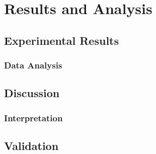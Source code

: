 \chapter{Results and Analysis}
\label{ch:results}

\lipsum[29-30]

\section{Experimental Results}
\label{sec:experimental-results}

\lipsum[31-32]

\subsection{Data Analysis}
\label{subsec:data-analysis}

\lipsum[33]

\section{Discussion}
\label{sec:discussion}

\lipsum[34-35]

\subsection{Interpretation}
\label{subsec:interpretation}

\lipsum[36]

\section{Validation}
\label{sec:validation}

\lipsum[37-38]